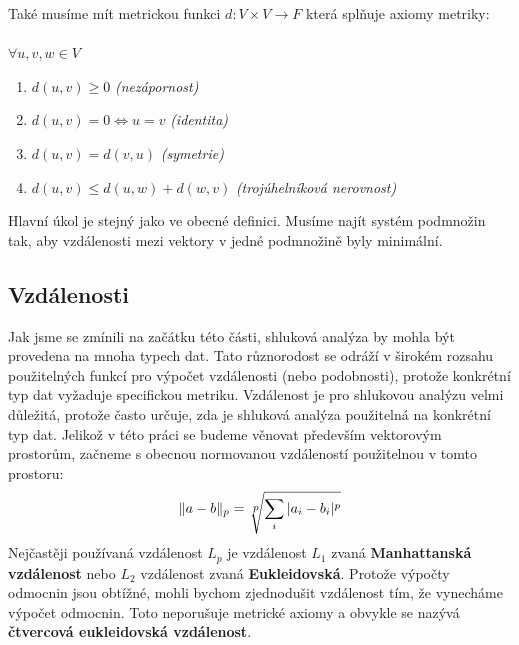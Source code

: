 Také musíme mít metrickou funkci $d:V \times V \to F$ která splňuje axiomy metriky:\\ \\
$ \forall  u, v, w \in V$
\begin{enumerate}
\item $d(u, v)\geq 0$ \textit{(nezápornost)}
\item $d(u, v) = 0 \iff u = v$ \textit{(identita)}
\item $d(u, v) = d(v, u)$ \textit{(symetrie)}
\item$d(u, v) \leq d(u, w) + d(w, v)$ \textit{(trojúhelníková nerovnost)}
\end{enumerate}

Hlavní úkol je stejný jako ve obecné definici. Musíme najít systém podmnožin tak, aby vzdálenosti mezi vektory v jedné podmnožině byly minimální.

\subsection{Vzdálenosti}
Jak jsme se zmínili na začátku této části, shluková analýza by mohla být provedena na mnoha typech dat. Tato různorodost se odráží v širokém rozsahu použitelných funkcí pro výpočet vzdálenosti (nebo podobnosti), protože konkrétní typ dat vyžaduje specifickou metriku. Vzdálenost je pro shlukovou analýzu velmi důležitá, protože často určuje, zda je shluková analýza použitelná na konkrétní typ dat. Jelikož v této práci se budeme věnovat především vektorovým prostorům, začneme s obecnou normovanou vzdáleností použitelnou v tomto prostoru: $$\|a-b\|_p=\sqrt[\leftroot{-1}\uproot{3}\scriptstyle p]{\sum_i |a_i - b_i|^p} $$
Nejčastěji používaná vzdálenost $L_p$ je vzdálenost $L_1$ zvaná \textbf {Manhattanská vzdálenost} nebo $L_2$ vzdálenost zvaná \textbf {Eukleidovská}.
Protože výpočty odmocnin jsou obtížné, mohli bychom zjednodušit vzdálenost tím, že vynecháme výpočet odmocnin. Toto neporušuje metrické axiomy a obvykle se nazývá \textbf {čtvercová eukleidovská vzdálenost}.\\


